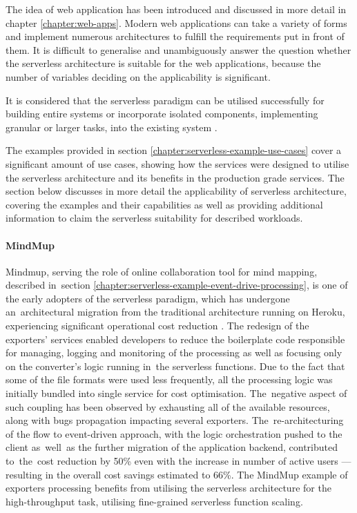 The idea of web application has been introduced and discussed in more detail in chapter \ref{chapter:web-apps}. Modern web applications can take a variety of forms and implement numerous architectures to fulfill the requirements put in front of them.
It is difficult to generalise and unambiguously answer the question whether the serverless architecture is suitable for the web applications, because the number of variables deciding on the applicability is significant.

It is considered that the serverless paradigm can be utilised successfully for building entire systems or incorporate isolated components, implementing granular or larger tasks, into the existing system \cite{ServerlessArchitectureOnAWS}.

The examples provided in section \ref{chapter:serverless-example-use-cases} cover a significant amount of use cases, showing how the services were designed to utilise the serverless architecture and its benefits in the production grade services. The section below discusses in more detail the applicability of serverless architecture, covering the examples and their capabilities as well as providing additional information to claim the serverless suitability for described workloads.

\paragraph{MindMup} \label{chapter:serverless-suitability-mindmup}

Mindmup, serving the role of online collaboration tool for mind mapping, described in~section \ref{chapter:serverless-example-event-drive-processing}, is one of the early adopters of the serverless paradigm, which has undergone an~architectural migration from the traditional architecture running on Heroku, experiencing significant operational cost reduction \cite{ServerlessComputingEconomicAndArchitecturalImpact}.
The redesign of the exporters' services enabled developers to reduce the boilerplate code responsible for managing, logging and monitoring of the processing as well as focusing only on the converter's logic running in~the serverless functions.
Due to the fact that some of the file formats were used less frequently, all the processing logic was initially bundled into single service for cost optimisation. The~negative aspect of such coupling has been observed by exhausting all of the available resources, along with bugs propagation impacting several exporters.
The~re-architecturing of the flow to event-driven approach, with the logic orchestration pushed to the client as~well~as the further migration of the application backend, contributed to~the~cost reduction by 50\% even with the increase in number of active users --- resulting in the overall cost savings estimated to 66\%.
The MindMup example of exporters processing benefits from utilising the serverless architecture for the high-throughput task, utilising fine-grained serverless function scaling.

